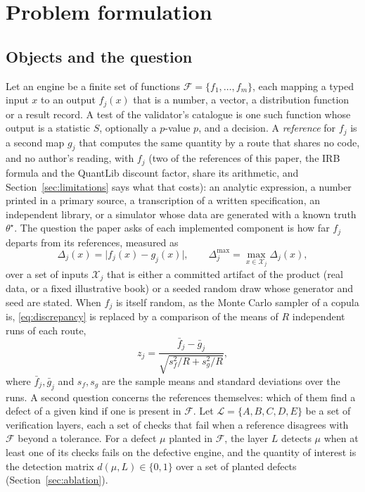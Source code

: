 \section{Problem formulation}
\label{sec:problem}

\subsection{Objects and the question}

Let an engine be a finite set of functions $\mathcal{F}=\{f_1,\dots,f_m\}$, each mapping a typed input $x$ to an output $f_j(x)$ that is a number, a vector, a distribution function or a result record. A test of the validator's catalogue is one such function whose output is a statistic $S$, optionally a $p$-value $p$, and a decision. A \emph{reference} for $f_j$ is a second map $g_j$ that computes the same quantity by a route that shares no code, and no author's reading, with $f_j$ (two of the references of this paper, the IRB formula and the QuantLib discount factor, share its arithmetic, and Section~\ref{sec:limitations} says what that costs): an analytic expression, a number printed in a primary source, a transcription of a written specification, an independent library, or a simulator whose data are generated with a known truth $\theta^{\star}$. The question the paper asks of each implemented component is how far $f_j$ departs from its references, measured as
\begin{equation}
  \Delta_j(x)=\bigl|f_j(x)-g_j(x)\bigr|,\qquad
  \Delta_j^{\max}=\max_{x\in\mathcal{X}_j}\Delta_j(x),
  \label{eq:discrepancy}
\end{equation}
over a set of inputs $\mathcal{X}_j$ that is either a committed artifact of the product (real data, or a fixed illustrative book) or a seeded random draw whose generator and seed are stated. When $f_j$ is itself random, as the Monte Carlo sampler of a copula is, \eqref{eq:discrepancy} is replaced by a comparison of the means of $R$ independent runs of each route,
\begin{equation}
  z_j=\frac{\bar f_j-\bar g_j}{\sqrt{s_f^2/R+s_g^2/R}},
  \label{eq:zdiff}
\end{equation}
where $\bar f_j,\bar g_j$ and $s_f,s_g$ are the sample means and standard deviations over the runs. A second question concerns the references themselves: which of them find a defect of a given kind if one is present in $\mathcal{F}$. Let $\mathcal{L}=\{A,B,C,D,E\}$ be a set of verification layers, each a set of checks that fail when a reference disagrees with $\mathcal{F}$ beyond a tolerance. For a defect $\mu$ planted in $\mathcal{F}$, the layer $L$ detects $\mu$ when at least one of its checks fails on the defective engine, and the quantity of interest is the detection matrix $d(\mu,L)\in\{0,1\}$ over a set of planted defects (Section~\ref{sec:ablation}).

